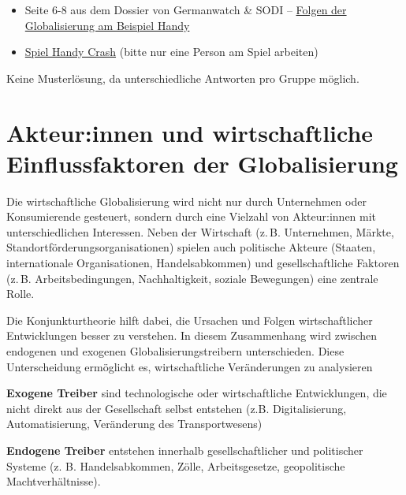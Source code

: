 \begin{myexercise}
\begin{textBox}[title=Hintergrund-Informationen und Recherche-Materialien]
\begin{itemize}
\begin{itemize}
                      \item Seite 6-8 aus dem Dossier von Germanwatch \& SODI – \href{https://www.germanwatch.org/sites/default/files/publication/11036.pdf}{Folgen der Globalisierung am Beispiel Handy}
                      \item \href{https://www.handycrash.org/}{Spiel Handy Crash} (bitte nur eine Person am Spiel arbeiten)
                  \end{itemize}
        \end{itemize}
    \end{textBox}
    \begin{myanswer}
        Keine Musterlösung, da unterschiedliche Antworten pro Gruppe möglich.
    \end{myanswer}

\end{myexercise}

\chapter{Akteur:innen und wirtschaftliche Einflussfaktoren der Globalisierung}

Die wirtschaftliche Globalisierung wird nicht nur durch Unternehmen oder Konsumierende gesteuert, sondern durch eine Vielzahl von Akteur:innen mit unterschiedlichen Interessen. Neben der Wirtschaft (z. B. Unternehmen, Märkte, Standortförderungsorganisationen) spielen auch politische Akteure (Staaten, internationale Organisationen, Handelsabkommen) und gesellschaftliche Faktoren (z. B. Arbeitsbedingungen, Nachhaltigkeit, soziale Bewegungen) eine zentrale Rolle.

Die Konjunkturtheorie \cite{keynes1936general} hilft dabei, die Ursachen und Folgen wirtschaftlicher Entwicklungen besser zu verstehen. In diesem Zusammenhang wird zwischen endogenen und exogenen Globalisierungstreibern unterschieden. Diese Unterscheidung ermöglicht es, wirtschaftliche Veränderungen zu analysieren

\begin{mydefinition}
\item \textbf{Exogene Treiber} sind technologische oder wirtschaftliche Entwicklungen, die nicht direkt aus der Gesellschaft selbst entstehen (z.B. Digitalisierung, Automatisierung, Veränderung des Transportwesens)
\item \textbf{Endogene Treiber} entstehen innerhalb gesellschaftlicher und politischer Systeme (z. B. Handelsabkommen, Zölle, Arbeitsgesetze, geopolitische Machtverhältnisse).
\end{mydefinition}


